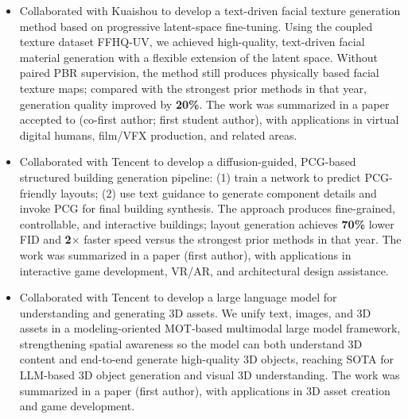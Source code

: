 \documentclass{resume}
\begin{document}
\vspace{-0.5ex}
\begin{onehalfspacing}
\begin{itemize}
\item
Collaborated with Kuaishou to develop a text-driven facial texture generation method based on progressive latent-space fine-tuning. Using the coupled texture dataset FFHQ-UV, we achieved high-quality, text-driven facial material generation with a flexible extension of the latent space. Without paired PBR supervision, the method still produces physically based facial texture maps; compared with the strongest prior methods in that year, generation quality improved by \textbf{20\%}. The work was summarized in a paper accepted to \textbf{} (co-first author; first student author), with applications in virtual digital humans, film/VFX production, and related areas.
\end{itemize}
\end{onehalfspacing}

\vspace{-0.5ex}
\begin{onehalfspacing}
\begin{itemize}
\item
Collaborated with Tencent to develop a diffusion-guided, PCG-based structured building generation pipeline: (1) train a network to predict PCG-friendly layouts; (2) use text guidance to generate component details and invoke PCG for final building synthesis. The approach produces fine-grained, controllable, and interactive buildings; layout generation achieves \textbf{70\%} lower FID and \textbf{2$\times$} faster speed versus the strongest prior methods in that year. The work was summarized in a \textbf{} paper (first author), with applications in interactive game development, VR/AR, and architectural design assistance.
\end{itemize}
\end{onehalfspacing}

\vspace{-0.5ex}
\begin{onehalfspacing}
\begin{itemize}
\item
Collaborated with Tencent to develop a large language model for understanding and generating 3D assets. We unify text, images, and 3D assets in a modeling-oriented MOT-based multimodal large model framework, strengthening spatial awareness so the model can both understand 3D content and end-to-end generate high-quality 3D objects, reaching SOTA for LLM-based 3D object generation and visual 3D understanding. The work was summarized in a \textbf{} paper (first author), with applications in 3D asset creation and game development.
\end{itemize}
\end{onehalfspacing}
\end{document}
